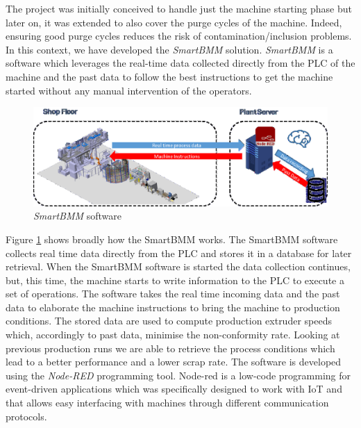 The project was initially conceived to handle just the machine starting phase but later on, it was extended to also cover the purge cycles of the machine. Indeed, ensuring good purge cycles reduces the risk of contamination/inclusion problems. In this context, we have developed the \textit{SmartBMM} solution. \textit{SmartBMM} is a software which leverages the real-time data collected directly from the PLC of the machine and the past data to follow the best instructions to get the machine started without any manual intervention of the operators.

\begin{figure}
\centerline{\includegraphics[scale=1]{images/chapter_3/SmartBMM.eps}}
\caption{\textit{SmartBMM} software}
\label{fig:SmartBMM}
\end{figure}

Figure \ref{fig:SmartBMM} shows broadly how the SmartBMM works. The SmartBMM software collects real time data directly from the PLC and stores it in a database for later retrieval. When the SmartBMM software is started the data collection continues, but, this time, the machine starts to write information to the PLC to execute a set of operations. The software takes the real time incoming data and the past data to elaborate the machine instructions to bring the machine to production conditions. The stored data are used to compute production extruder speeds which, accordingly to past data, minimise the non-conformity rate. Looking at previous production runs we are able to retrieve the process conditions which lead to a better performance and a lower scrap rate. The software is developed using the \textit{Node-RED} \citep{nodered} programming tool. Node-red is a low-code programming for event-driven applications which was specifically designed to work with IoT and that allows easy interfacing with machines through different communication protocols.

